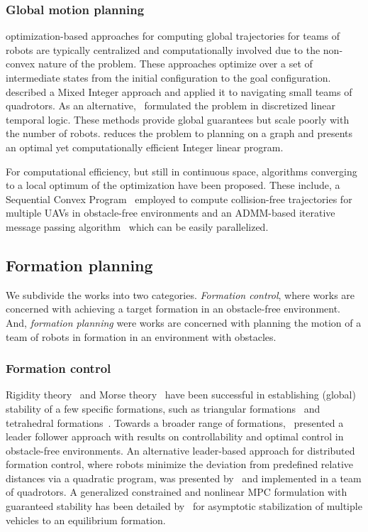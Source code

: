 \subsubsection{Global motion planning}
optimization-based approaches for computing global trajectories for teams of robots are typically centralized and computationally involved due to the non-convex nature of the problem. These approaches optimize over a set of intermediate states from the initial configuration to the goal configuration.
\cite{Mellinger:2012fi} described a Mixed Integer approach and applied it to navigating small teams of quadrotors. As an alternative,~\cite{Saha:2014vi} formulated the problem in discretized linear temporal logic. These methods provide global guarantees but scale poorly with the number of robots. \cite{Yu:2013ij} reduces the problem to planning on a graph and presents an optimal yet computationally efficient Integer linear program.

For computational efficiency, but still in continuous space, algorithms converging to a local optimum of the optimization have been proposed. These include, a Sequential Convex Program~\cite{augugliaro12} employed to compute collision-free trajectories for multiple UAVs in obstacle-free environments and an ADMM-based iterative message passing algorithm~\cite{Bento:2013td} which can be easily parallelized.

\subsection{Formation planning}

We subdivide the works into two categories. \emph{Formation control}, where works are concerned with achieving a target formation in an obstacle-free environment. And, \emph{formation planning} were works are concerned with planning the motion of a team of robots in formation in an environment with obstacles.

\subsubsection{Formation control}
Rigidity theory~\cite{Eren.Belhumeur.ea:02} and Morse theory~\cite{Anderson:11} have been successful in establishing (global) stability of a few specific formations, such as triangular formations~\cite{Cao.Morse.ea:11} and tetrahedral formations~\cite{Anderson.Yu.ea:10}.
Towards a broader range of formations,~\cite{Ji:2006tr} presented a leader follower approach with results on controllability and optimal control in obstacle-free environments. An alternative leader-based approach for distributed formation control, where robots minimize the deviation from predefined relative distances via a quadratic program, was presented by~\cite{Turpin:2012uh} and implemented in a team of quadrotors.
A generalized constrained and nonlinear MPC formulation with guaranteed stability has been detailed by~\cite{Dunbar:2002fh} for asymptotic stabilization of multiple vehicles to an equilibrium formation.


